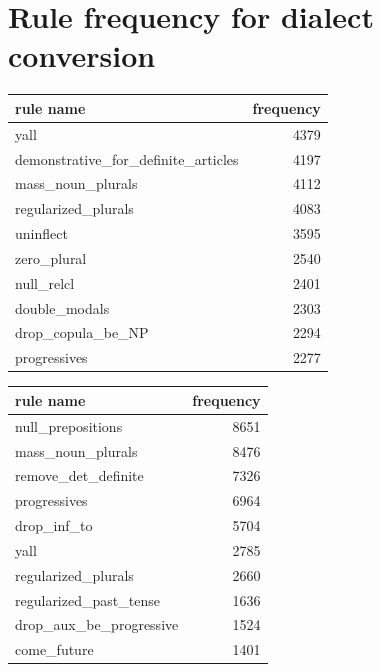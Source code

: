 \documentclass[11pt]{article}
\begin{document}
\section{Rule frequency for dialect conversion} \label{rules}

\begin{center}
\begin{tabular}{lr}
\hline
\textbf{rule name}                     & \textbf{frequency} \\ \hline
yall                                   & 4379               \\
demonstrative\_for\_definite\_articles & 4197               \\
mass\_noun\_plurals                    & 4112               \\
regularized\_plurals                   & 4083               \\
uninflect                              & 3595               \\
zero\_plural                           & 2540               \\
null\_relcl                            & 2401               \\
double\_modals                         & 2303               \\
drop\_copula\_be\_NP                   & 2294               \\
progressives                           & 2277               \\ \hline
\end{tabular}
\end{center}

\begin{center}
\begin{tabular}{lr}
\hline
\textbf{rule name}         & \textbf{frequency} \\ \hline
null\_prepositions         & 8651               \\
mass\_noun\_plurals        & 8476               \\
remove\_det\_definite      & 7326               \\
progressives               & 6964               \\
drop\_inf\_to              & 5704               \\
yall                       & 2785               \\
regularized\_plurals       & 2660               \\
regularized\_past\_tense   & 1636               \\
drop\_aux\_be\_progressive & 1524               \\
come\_future               & 1401               \\ \hline
\end{tabular}
\end{center}
\end{document}
